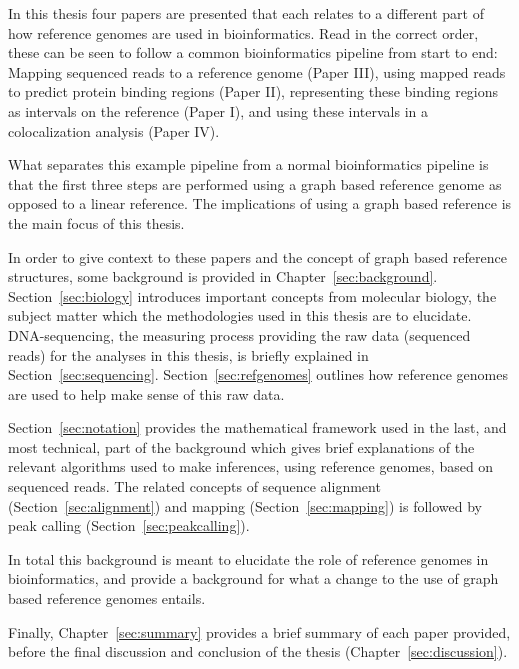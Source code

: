 In this thesis four papers are presented that each relates to a different part of how reference genomes are used in bioinformatics.
Read in the correct order, these can be seen to follow a common bioinformatics pipeline from start to end: Mapping sequenced reads to a reference genome (Paper III), using mapped reads to predict protein binding regions (Paper II), representing these binding regions as intervals on the reference (Paper I), and using these intervals in a colocalization analysis (Paper IV).

What separates this example pipeline from a normal bioinformatics pipeline is that the first three steps are performed using a graph based reference genome as opposed to a linear reference.
The implications of using a graph based reference is the main focus of this thesis.

In order to give context to these papers and the concept of graph based reference structures, some background is provided in Chapter~\ref{sec:background}.
Section~\ref{sec:biology} introduces important concepts from molecular biology, the subject matter which the methodologies used in this thesis are  to elucidate.
DNA-sequencing, the measuring process providing the raw data (sequenced reads) for the analyses in this thesis, is briefly explained in Section~\ref{sec:sequencing}.
Section~\ref{sec:refgenomes} outlines how reference genomes are used to help make sense of this raw data.

Section~\ref{sec:notation} provides the mathematical framework used in the last, and most technical, part of the background which gives brief explanations of the relevant algorithms used to make inferences, using reference genomes, based on sequenced reads.
The related concepts of sequence alignment (Section~\ref{sec:alignment}) and mapping (Section~\ref{sec:mapping}) is followed by peak calling (Section~\ref{sec:peakcalling}).

In total this background is meant to elucidate the role of reference genomes in bioinformatics, and provide a background for what a change to the use of graph based reference genomes entails.

Finally, Chapter~\ref{sec:summary} provides a brief summary of each paper provided, before the final discussion and conclusion of the thesis (Chapter~\ref{sec:discussion}).

